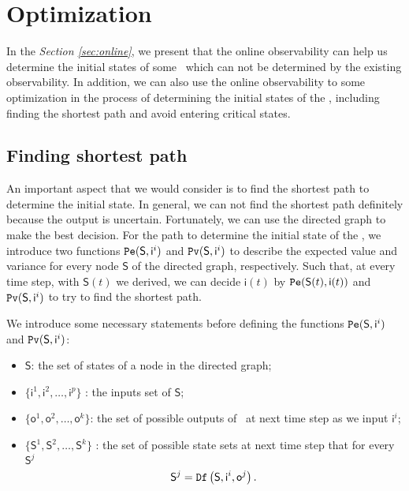 \section{Optimization}
\label{sec:app}

In the {\em Section \ref{sec:online}}, we present that the online observability can help us determine the initial states of some \BCNs\ which can not be determined by the existing observability. In addition, we can also use the online observability to some optimization in the process of determining the initial states of the \BCNs, including finding the shortest path and avoid entering critical states. 

\subsection{Finding shortest path}
An important aspect that we would consider is to find the shortest path to determine the initial state. In general, we can not find the shortest path definitely because the output is uncertain. Fortunately, we can use the directed graph to make the best decision. For the path to determine the initial state of the \BCNs, we introduce two functions ${\tt Pe}(\mathsf{S},\mathsf{ i}^{i})$ and ${\tt Pv}(\mathsf{S},\mathsf{ i}^{i})$ to describe the expected value and variance for every node $\mathsf{S}$ of the directed graph, respectively. Such that, at every time step, with $\mathsf{S}(t)$ we derived, we can decide $\mathsf{i}(t)$ by ${\tt Pe}(\mathsf{S}(t),\mathsf{ i}(t))$ and ${\tt Pv}(\mathsf{S},\mathsf{ i}^{i})$ to try to find the shortest path. 

We introduce some necessary statements before defining the functions ${\tt Pe}(\mathsf{S},\mathsf{ i}^{i})$ and ${\tt Pv}(\mathsf{S},\mathsf{ i}^{i})$:
\begin{itemize}
  \item $\mathsf{S}$: the set of states of a node in the directed graph;
  \item $\{\mathsf{ i}^{1},\mathsf{ i}^{2},\ldots, \mathsf{ i}^{p}\}$ : the inputs set of $\mathsf{S}$;
  \item $\{\mathsf{o}^1,\mathsf{o}^2,\ldots,\mathsf{o}^k\}$: the set of possible outputs of \BCN\ at next time step as we input $\mathsf{ i}^{i}$;
 \item $\{\mathsf{S}^{1},\mathsf{S}^{2},\ldots, \mathsf{S}^{k}\}$ : the set of possible state sets at next time step that for every $\mathsf{S}^{j}$ \[\mathsf{S}^{j}={\tt Df}\left(\mathsf{S},\mathsf{i}^{i},\mathsf{o}^{j}\right).\] 
  
\end{itemize} 

